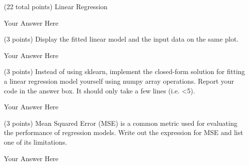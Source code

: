 \documentclass[12pt]{article}
\begin{document}
\begin{question}{(22 total points) Linear Regression}
\begin{subquestion}
\begin{answerbox}{10em}
Your Answer Here
\end{answerbox}



\end{subquestion}



%
%
\begin{subquestion}{(3 points) Display the fitted linear model and the input data on the same plot.
}


\begin{answerbox}{35em}
Your Answer Here
\end{answerbox}



\end{subquestion}



%
%
\begin{subquestion}{(3 points) Instead of using sklearn, implement the closed-form solution for fitting a linear regression model yourself using numpy array operations.  
Report your code in the answer box.
It should only take a few lines (i.e. <5).\\ 
}


\begin{answerbox}{20em}
Your Answer Here
\end{answerbox}



\end{subquestion}



%
%
\begin{subquestion}{(3 points) Mean Squared Error (MSE) is a common metric used for evaluating the performance of regression models. 
Write out the expression for MSE and list one of its limitations. \\
}


\begin{answerbox}{10em}
Your Answer Here
\end{answerbox}



\end{subquestion}



\end{question}
\end{document}

